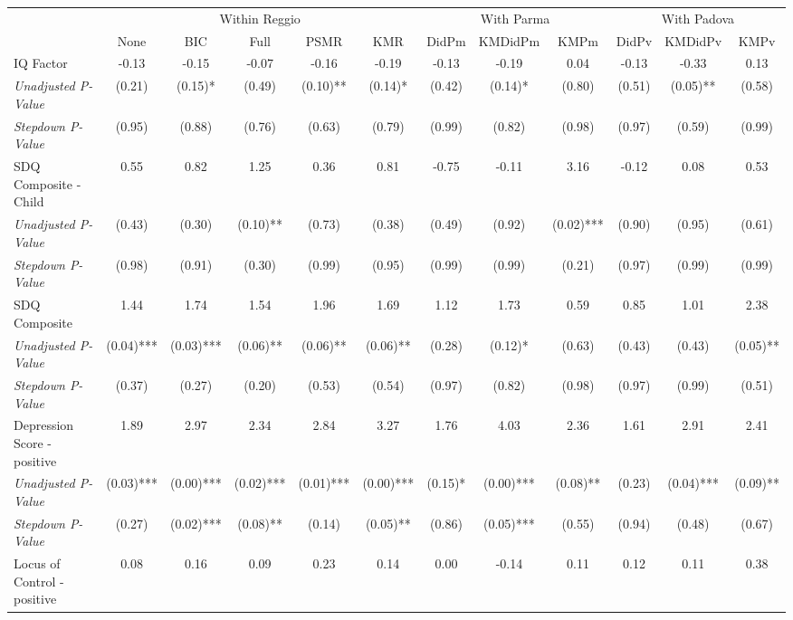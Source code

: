 \begin{tabular}{l c c c c c c c c c c c}
\toprule
& \multicolumn{5}{c}{Within Reggio} & \multicolumn{3}{c}{With Parma} & \multicolumn{3}{c}{With Padova} \\\cmidrule(lr){2-6} \cmidrule(lr){7-9} \cmidrule(lr){10-12}
 & None & BIC & Full & PSMR & KMR & DidPm & KMDidPm & KMPm & DidPv & KMDidPv & KMPv \\
\midrule
IQ Factor & -0.13 & -0.15 & -0.07 & -0.16 & -0.19 & -0.13 & -0.19 & 0.04 & -0.13 & -0.33 & 0.13 \\
\quad \textit{Unadjusted P-Value} & (0.21) & (0.15)* & (0.49) & (0.10)** & (0.14)* & (0.42) & (0.14)* & (0.80) & (0.51) & (0.05)** & (0.58) \\
\quad \textit{Stepdown P-Value} & (0.95) & (0.88) & (0.76) & (0.63) & (0.79) & (0.99) & (0.82) & (0.98) & (0.97) & (0.59) & (0.99) \\
SDQ Composite - Child & 0.55 & 0.82 & 1.25 & 0.36 & 0.81 & -0.75 & -0.11 & 3.16 & -0.12 & 0.08 & 0.53 \\
\quad \textit{Unadjusted P-Value} & (0.43) & (0.30) & (0.10)** & (0.73) & (0.38) & (0.49) & (0.92) & (0.02)*** & (0.90) & (0.95) & (0.61) \\
\quad \textit{Stepdown P-Value} & (0.98) & (0.91) & (0.30) & (0.99) & (0.95) & (0.99) & (0.99) & (0.21) & (0.97) & (0.99) & (0.99) \\
SDQ Composite & 1.44 & 1.74 & 1.54 & 1.96 & 1.69 & 1.12 & 1.73 & 0.59 & 0.85 & 1.01 & 2.38 \\
\quad \textit{Unadjusted P-Value} & (0.04)*** & (0.03)*** & (0.06)** & (0.06)** & (0.06)** & (0.28) & (0.12)* & (0.63) & (0.43) & (0.43) & (0.05)** \\
\quad \textit{Stepdown P-Value} & (0.37) & (0.27) & (0.20) & (0.53) & (0.54) & (0.97) & (0.82) & (0.98) & (0.97) & (0.99) & (0.51) \\
Depression Score - positive & 1.89 & 2.97 & 2.34 & 2.84 & 3.27 & 1.76 & 4.03 & 2.36 & 1.61 & 2.91 & 2.41 \\
\quad \textit{Unadjusted P-Value} & (0.03)*** & (0.00)*** & (0.02)*** & (0.01)*** & (0.00)*** & (0.15)* & (0.00)*** & (0.08)** & (0.23) & (0.04)*** & (0.09)** \\
\quad \textit{Stepdown P-Value} & (0.27) & (0.02)*** & (0.08)** & (0.14) & (0.05)** & (0.86) & (0.05)*** & (0.55) & (0.94) & (0.48) & (0.67) \\
Locus of Control - positive & 0.08 & 0.16 & 0.09 & 0.23 & 0.14 & 0.00 & -0.14 & 0.11 & 0.12 & 0.11 & 0.38 \\

\end{tabular}
